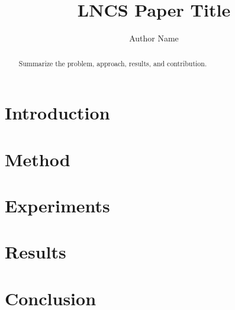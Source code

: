 \documentclass[runningheads]{llncs}
\title{LNCS Paper Title}
\author{Author Name\inst{1}}
\institute{Institution\\\email{author@example.com}}
\begin{document}
\maketitle

\begin{abstract}
Summarize the problem, approach, results, and contribution.
\end{abstract}

\section{Introduction}
\section{Method}
\section{Experiments}
\section{Results}
\section{Conclusion}

% 
% 
\end{document}
